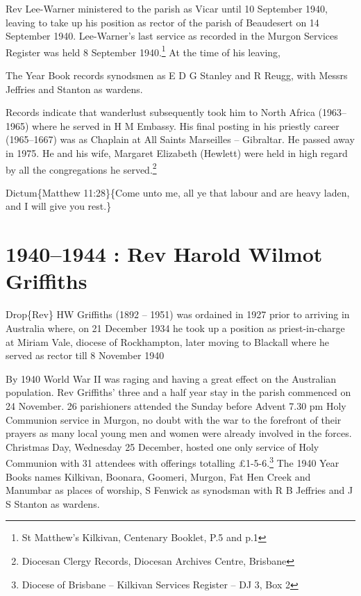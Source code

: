 Rev Lee-Warner ministered to the parish as Vicar until 10 September 1940, leaving to take up his position as rector of the parish of Beaudesert on 14 September 1940. Lee-Warner's last service as recorded in the Murgon Services Register was held 8 September 1940.\footnote{St Matthew's Kilkivan, Centenary Booklet, P.5 and p.1} At the time of his leaving,

The Year Book records synodsmen as E D G Stanley and R Reugg, with Messrs Jeffries and Stanton as wardens.

Records indicate that wanderlust subsequently took him to North Africa (1963--1965) where he served in H M Embassy. His final posting in his priestly career (1965--1667) was as Chaplain at All Saints Marseilles -- Gibraltar. He passed away in 1975. He and his wife, Margaret Elizabeth (Hewlett) were held in high regard by all the congregations he served.\footnote{Diocesan Clergy Records, Diocesan Archives Centre, Brisbane}

Dictum\{Matthew 11:28\}\{Come unto me, all ye that labour and are heavy laden, and I will give you rest.\}

\hypertarget{rev-harold-wilmot-griffiths}{%
\chapter{1940--1944 : Rev Harold Wilmot Griffiths}\label{rev-harold-wilmot-griffiths}}

Drop\{Rev\} HW Griffiths (1892 -- 1951) was ordained in 1927 prior to arriving in Australia where, on 21 December 1934 he took up a position as priest-in-charge at Miriam Vale, diocese of Rockhampton, later moving to Blackall where he served as rector till 8 November 1940

By 1940 World War II was raging and having a great effect on the Australian population. Rev Griffiths' three and a half year stay in the parish commenced on 24 November. 26 parishioners attended the Sunday before Advent 7.30 pm Holy Communion service in Murgon, no doubt with the war to the forefront of their prayers as many local young men and women were already involved in the forces. Christmas Day, Wednesday 25 December, hosted one only service of Holy Communion with 31 attendees with offerings totalling £1-5-6.\footnote{Diocese of Brisbane -- Kilkivan Services Register -- DJ 3, Box 2} The 1940 Year Books names Kilkivan, Boonara, Goomeri, Murgon, Fat Hen Creek and Manumbar as places of worship, S Fenwick as synodsman with R B Jeffries and J S Stanton as wardens.


